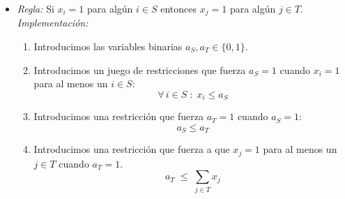 \documentclass[ 10pt, xcolor = dvipsnames]{beamer}
\begin{document}
\begin{frame}[allowframebreaks]
\frametitle{\insertsection}

\begin{itemize}
\item \emph{Regla:} Si $x_i = 1$ para alg\'un $i \in S$ entonces $x_j = 1$ para alg\'un $j \in T$. \\[1ex] \emph{Implementaci\'on:}
\begin{enumerate}
\item Introducimos las variables binarias $a_S, a_T \in \{ 0, 1 \}$. 
\item Introducimos un juego de restricciones que fuerza $a_S = 1$ cuando $x_i = 1$ \linebreak para al menos un $i \in S$: 
\[
\forall \, i \in S \; \colon \; x_i \leq a_S
\]
\item Introducimos una restricci\'on que fuerza $a_T = 1$ cuando $a_S = 1$: 
\[
a_S \leq a_T
\]
\item Introducimos una restricci\'on que fuerza a que $x_j = 1$ para al menos un $j \in T$ cuando $a_T = 1$. 
\[
a_T \; \leq \; \sum_{j \in T} x_j
\]
\end{enumerate}
\end{itemize}

\end{frame}
\end{document}
